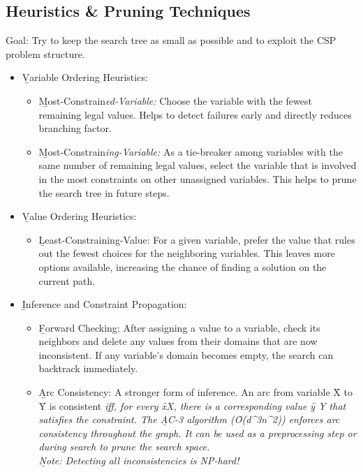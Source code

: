 \subsection{Heuristics \& Pruning Techniques}
Goal: Try to keep the search tree as small as possible and to exploit the CSP problem structure.
\begin{itemize}
  \item \b{Variable Ordering Heuristics:}
  \begin{itemize}
     \item \b{Most-Constrain\it{ed}-Variable:} Choose the variable with the fewest remaining legal values. Helps to detect failures early and directly reduces branching factor.
     \item \b{Most-Constrain\it{ing}-Variable:} As a tie-breaker among variables with the same number of remaining legal values, select the variable that is involved in the most constraints on other unassigned variables. This helps to prune the search tree in future steps.
  \end{itemize}
  \item \b{Value Ordering Heuristics:}
  \begin{itemize}
     \item \b{Least-Constraining-Value:} For a given variable, prefer the value that rules out the fewest choices for the neighboring variables. This leaves more options available, increasing the chance of finding a solution on the current path.
  \end{itemize}
  \item \b{Inference and Constraint Propagation:}
  \begin{itemize}
     \item \b{Forward Checking:} After assigning a value to a variable, check its neighbors and delete any values from their domains that are now inconsistent. If any variable's domain becomes empty, the search can backtrack immediately.
    \item \b{Arc Consistency:} A stronger form of inference. An arc from variable \f{X} to \f{Y} is consistent \it{iff}, for every \f{x\in X}, there is a corresponding value \f{y \in Y} that satisfies the constraint. The \b{AC-3 algorithm} (\f{O(d^3n^2)}) enforces arc consistency throughout the graph. It can be used as a preprocessing step or during search to prune the search space.\\
    \b{Note:} Detecting all inconsistencies is NP-hard!
  \end{itemize}
\end{itemize}


